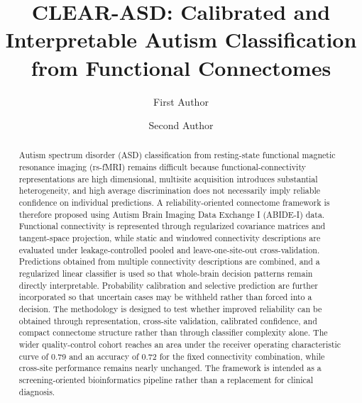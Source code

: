 \documentclass[a4paper,fleqn]{cas-sc}
\begin{document}
\let\WriteBookmarks\relax
\def\floatpagepagefraction{1}
\def\textpagefraction{.001}


\title[mode=title]{CLEAR-ASD: Calibrated and Interpretable Autism Classification from Functional Connectomes}

\author[1]{First Author}
\cormark[1]

\author[1]{Second Author}



\begin{abstract}
Autism spectrum disorder (ASD) classification from resting-state functional magnetic resonance imaging (rs-fMRI) remains difficult because functional-connectivity representations are high dimensional, multisite acquisition introduces substantial heterogeneity, and high average discrimination does not necessarily imply reliable confidence on individual predictions. A reliability-oriented connectome framework is therefore proposed using Autism Brain Imaging Data Exchange I (ABIDE-I) data. Functional connectivity is represented through regularized covariance matrices and tangent-space projection, while static and windowed connectivity descriptions are evaluated under leakage-controlled pooled and leave-one-site-out cross-validation. Predictions obtained from multiple connectivity descriptions are combined, and a regularized linear classifier is used so that whole-brain decision patterns remain directly interpretable. Probability calibration and selective prediction are further incorporated so that uncertain cases may be withheld rather than forced into a decision. The methodology is designed to test whether improved reliability can be obtained through representation, cross-site validation, calibrated confidence, and compact connectome structure rather than through classifier complexity alone. The wider quality-control cohort reaches an area under the receiver operating characteristic curve of 0.79 and an accuracy of 0.72 for the fixed connectivity combination, while cross-site performance remains nearly unchanged. The framework is intended as a screening-oriented bioinformatics pipeline rather than a replacement for clinical diagnosis.
\end{abstract}
\end{document}
